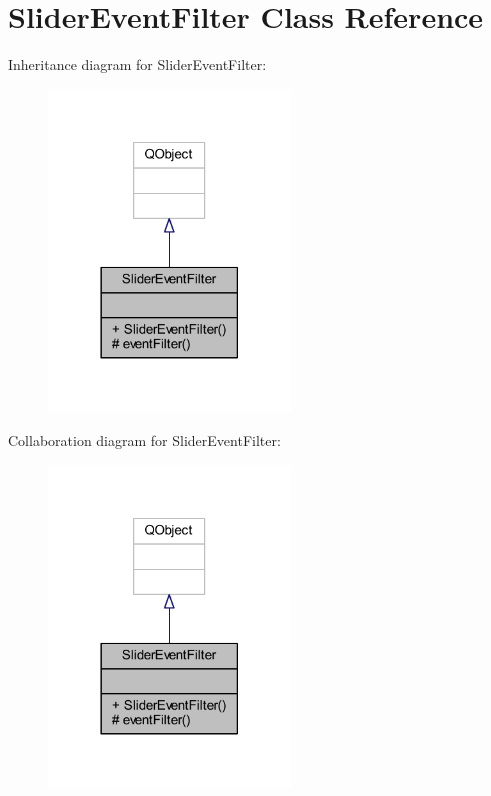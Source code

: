 \hypertarget{class_slider_event_filter}{}\section{Slider\+Event\+Filter Class Reference}
\label{class_slider_event_filter}


Inheritance diagram for Slider\+Event\+Filter\+:
\nopagebreak
\begin{figure}[H]
\begin{center}
\leavevmode
\includegraphics[width=182pt]{class_slider_event_filter__inherit__graph}
\end{center}
\end{figure}


Collaboration diagram for Slider\+Event\+Filter\+:
\nopagebreak
\begin{figure}[H]
\begin{center}
\leavevmode
\includegraphics[width=182pt]{class_slider_event_filter__coll__graph}
\end{center}
\end{figure}
